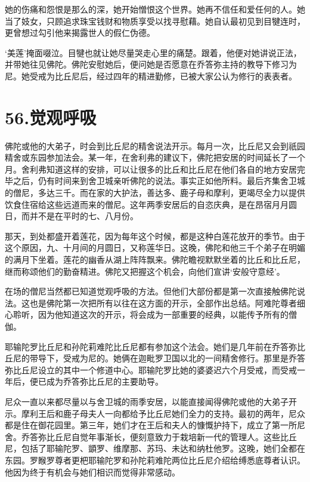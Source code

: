\documentclass[12pt,twoside,openany]{book}
\begin{document}
她的伤痛和怨恨是那么的深，她开始憎恨这个世界。她再不信任和爱任何的人。她当了妓女，只顾追求珠宝钱财和物质享受以找寻慰藉。她自认最初见到目犍连时，更曾想过勾引他来揭露世人的假仁伪德。

‘美莲’掩面啜泣。目犍也就让她尽量哭走心里的痛楚。跟着，他便对她讲说正法，并带她往见佛陀。佛陀安慰她后，便问她是否愿意在乔答弥主持的教导下修习为尼。她受戒为比丘尼后，经过四年的精进勤修，已被大家公认为修行的表表者。


\chapter{56.觉观呼吸}\label{ch56}

佛陀或他的大弟子，时会到比丘尼的精舍说法开示。每月一次，比丘尼又会到祇园精舍或东园参加法会。某一年，在舍利弗的建议下，佛陀把安居的时间延长了一个月。舍利弗知道这样的安排，可以让很多的比丘和比丘尼在他们各自的地方安居完毕之后，仍有时间来到舍卫城亲听佛陀的说法。事实正如他所料。最后齐集舍卫城的僧尼，多达三千。而在家的大护法，善达多、鹿子母和摩利，更竭尽全力以提供饮食住宿给这些远道而来的僧尼。这年两季安居后的自恣庆典，是在昂宿月月圆日，而并不是在平时的七、八月份。

那天，到处都盛开着莲花，因为每年这个时候，都是这种白莲花放开的季节。由于这个原因，九、十月间的月圆日，又称莲华日。这晚，佛陀和他三千个弟子在明媚的满月下坐着。莲花的幽香从湖上阵阵飘来。佛陀瞻视默默坐着的比丘和比丘尼，继而称颂他们的勤奋精进。佛陀又把握这个机会，向他们宣讲‘安般守意经’。

在场的僧尼当然都已知道觉观呼吸的方法。但他们大部份都是第一次直接触佛陀说法。这也是佛陀第一次把所有以往在这方面的开示，全部作出总结。阿难陀尊者细心聆听，因为他知道这次的开示，将会成为一部重要的经典，以能传予所有的僧伽。

耶输陀罗比丘尼和孙陀莉难陀比丘尼都有参加这个法会。她们是几年前在乔答弥比丘尼的带导下，受戒为尼的。她俩在迦毗罗卫国以北的一间精舍修行。那里是乔答弥比丘尼设立的其中一个修道中心。耶输陀罗比她的婆婆迟六个月受戒，而受戒一年后，便已成为乔答弥比丘尼的主要助导。

尼众一直以来都尽量以与舍卫城的雨季安居，以能直接闻得佛陀或他的大弟子开示。摩利王后和鹿子母夫人一向都给予比丘尼她们全力的支持。最初的两年，尼众都是住在御花园里。第三年，她们才在王后和夫人的慷慨护持下，成立了第一所尼舍。乔答弥比丘尼自觉年事渐长，便刻意致力于栽培新一代的管理人。这些比丘尼，包括了耶输陀罗、顗罗、维摩那、苏玛、未达和纳杜他罗。这晚，她们全都在东园。罗睺罗尊者更杷耶输陀罗和孙陀莉难陀两位比丘尼介绍给缚悉底尊者认识。他因为终于有机会与她们相识而觉得非常感动。
\end{document}
